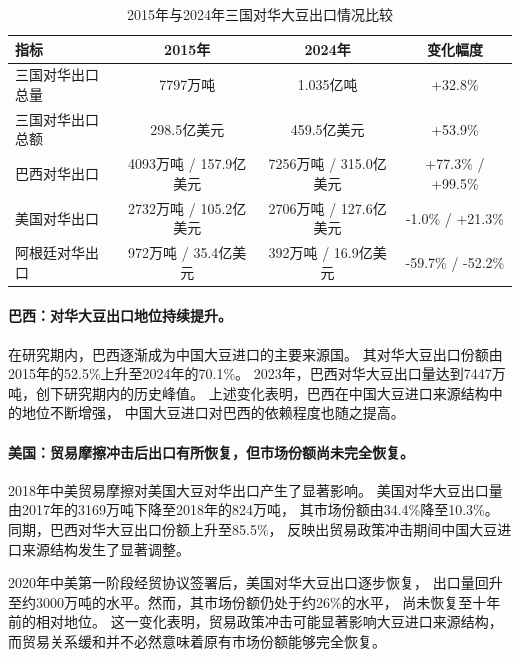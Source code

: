 \documentclass{apmcmthesis}
\begin{document}
\begin{table}[H]
    \centering
    \caption{2015年与2024年三国对华大豆出口情况比较}
    \label{tab:soybean_trade_trend}
    \begin{tabular}{lccc}
        \toprule
        指标 & 2015年 & 2024年 & 变化幅度 \\
        \midrule
        三国对华出口总量
        & 7797万吨
        & 1.035亿吨
        & +32.8\% \\

        三国对华出口总额
        & 298.5亿美元
        & 459.5亿美元
        & +53.9\% \\

        巴西对华出口
        & 4093万吨 / 157.9亿美元
        & 7256万吨 / 315.0亿美元
        & +77.3\% / +99.5\% \\

        美国对华出口
        & 2732万吨 / 105.2亿美元
        & 2706万吨 / 127.6亿美元
        & -1.0\% / +21.3\% \\

        阿根廷对华出口
        & 972万吨 / 35.4亿美元
        & 392万吨 / 16.9亿美元
        & -59.7\% / -52.2\% \\
        \bottomrule
    \end{tabular}
\end{table}

\paragraph{巴西：对华大豆出口地位持续提升。}

在研究期内，巴西逐渐成为中国大豆进口的主要来源国。
其对华大豆出口份额由2015年的52.5\%上升至2024年的70.1\%。
2023年，巴西对华大豆出口量达到7447万吨，创下研究期内的历史峰值。
上述变化表明，巴西在中国大豆进口来源结构中的地位不断增强，
中国大豆进口对巴西的依赖程度也随之提高。

\paragraph{美国：贸易摩擦冲击后出口有所恢复，但市场份额尚未完全恢复。}

2018年中美贸易摩擦对美国大豆对华出口产生了显著影响。
美国对华大豆出口量由2017年的3169万吨下降至2018年的824万吨，
其市场份额由34.4\%降至10.3\%。
同期，巴西对华大豆出口份额上升至85.5\%，
反映出贸易政策冲击期间中国大豆进口来源结构发生了显著调整。

2020年中美第一阶段经贸协议签署后，美国对华大豆出口逐步恢复，
出口量回升至约3000万吨的水平。然而，其市场份额仍处于约26\%的水平，
尚未恢复至十年前的相对地位。
这一变化表明，贸易政策冲击可能显著影响大豆进口来源结构，
而贸易关系缓和并不必然意味着原有市场份额能够完全恢复。
\end{document}
